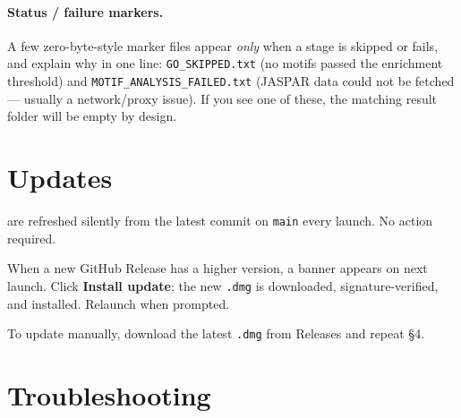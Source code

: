 \documentclass[11pt]{article}
\begin{document}
\paragraph{Status / failure markers.}
A few zero-byte-style marker files appear \emph{only} when a stage is
skipped or fails, and explain why in one line:
\texttt{GO\_SKIPPED.txt} (no motifs passed the enrichment threshold) and
\texttt{MOTIF\_ANALYSIS\_FAILED.txt} (JASPAR data could not be fetched ---
usually a network/proxy issue). If you see one of these, the matching
result folder will be empty by design.

\section{Updates}

\begin{description}[leftmargin=0pt]
  \item[Python scripts] are refreshed silently from the latest commit on
        \texttt{main} every launch. No action required.
  \item[App binary] When a new GitHub Release has a higher version, a
        banner appears on next launch. Click \textbf{Install update}; the
        new \texttt{.dmg} is downloaded, signature-verified, and
        installed. Relaunch when prompted.
\end{description}

To update manually, download the latest \texttt{.dmg} from Releases and
repeat \S4.

\section{Troubleshooting}
\end{document}
